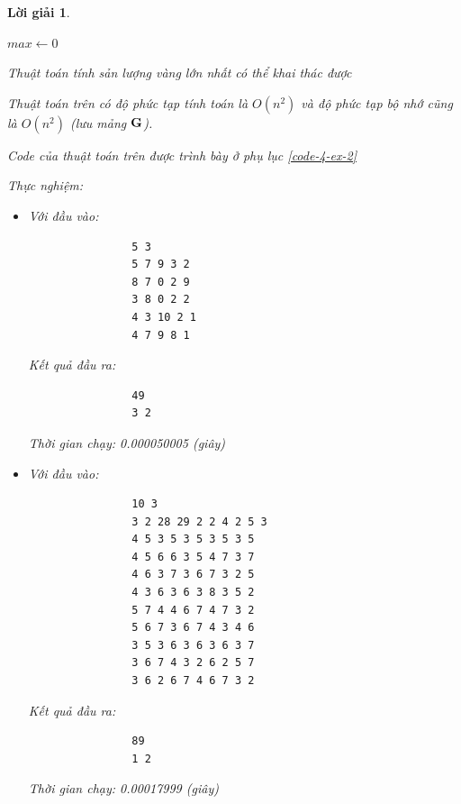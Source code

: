 \documentclass[14pt, a4paper]{article}
\theoremstyle{sltheorem}
\theoremstyle{soltheorem}
\newtheorem*{loigiai}{Lời giải}
\begin{document}
\begin{loigiai}
\begin{itemize} [label={$-$}]
\begin{algorithm}[h!]
            $max \gets 0$\;
            \;
            \caption{Thuật toán tính sản lượng vàng lớn nhất có thể khai thác được}
        \end{algorithm}

        Thuật toán trên có độ phức tạp tính toán là $O(n^2)$ và độ phức tạp bộ nhớ cũng là $O(n^2)$ (lưu mảng $\bold{G}$).

        Code của thuật toán trên được trình bày ở phụ lục \ref{code-4-ex-2}

        Thực nghiệm:

        \begin{itemize}
            \item Với đầu vào:
            \begin{verbatim}
                5 3        
                5 7 9 3 2
                8 7 0 2 9
                3 8 0 2 2
                4 3 10 2 1
                4 7 9 8 1
            \end{verbatim}
            Kết quả đầu ra:
            \begin{verbatim}
                49
                3 2
            \end{verbatim}
            Thời gian chạy: 0.000050005 (giây)
            \item Với đầu vào:
            \begin{verbatim}
                10 3
                3 2 28 29 2 2 4 2 5 3
                4 5 3 5 3 5 3 5 3 5
                4 5 6 6 3 5 4 7 3 7
                4 6 3 7 3 6 7 3 2 5
                4 3 6 3 6 3 8 3 5 2
                5 7 4 4 6 7 4 7 3 2
                5 6 7 3 6 7 4 3 4 6
                3 5 3 6 3 6 3 6 3 7
                3 6 7 4 3 2 6 2 5 7
                3 6 2 6 7 4 6 7 3 2
            \end{verbatim}
            Kết quả đầu ra:
            \begin{verbatim}
                89
                1 2
            \end{verbatim}
            Thời gian chạy: 0.00017999 (giây)
        \end{itemize}

    \end{itemize}

    \end{loigiai}
\end{document}
